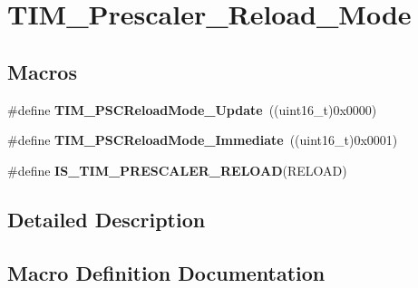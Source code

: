 \hypertarget{group___t_i_m___prescaler___reload___mode}{}\section{T\+I\+M\+\_\+\+Prescaler\+\_\+\+Reload\+\_\+\+Mode}
\label{group___t_i_m___prescaler___reload___mode}
\subsection*{Macros}
\begin{DoxyCompactItemize}
\item 
\hypertarget{group___t_i_m___prescaler___reload___mode_gad76dd05a3ae4e44e040e0e083bd460bf}{}\#define {\bfseries T\+I\+M\+\_\+\+P\+S\+C\+Reload\+Mode\+\_\+\+Update}~((uint16\+\_\+t)0x0000)\label{group___t_i_m___prescaler___reload___mode_gad76dd05a3ae4e44e040e0e083bd460bf}

\item 
\hypertarget{group___t_i_m___prescaler___reload___mode_ga9ba55481ccdcb64268b7b9f2095bfc17}{}\#define {\bfseries T\+I\+M\+\_\+\+P\+S\+C\+Reload\+Mode\+\_\+\+Immediate}~((uint16\+\_\+t)0x0001)\label{group___t_i_m___prescaler___reload___mode_ga9ba55481ccdcb64268b7b9f2095bfc17}

\item 
\#define {\bfseries I\+S\+\_\+\+T\+I\+M\+\_\+\+P\+R\+E\+S\+C\+A\+L\+E\+R\+\_\+\+R\+E\+L\+O\+A\+D}(R\+E\+L\+O\+A\+D)
\end{DoxyCompactItemize}


\subsection{Detailed Description}


\subsection{Macro Definition Documentation}
\hypertarget{group___t_i_m___prescaler___reload___mode_ga156317fc6b2c1f6f2e1da9dfa555ecf4}{}
